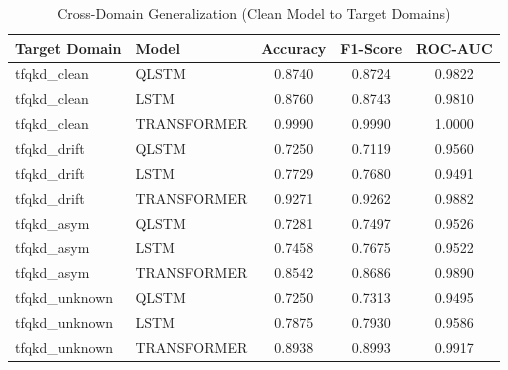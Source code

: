 \begin{table}[htbp]
\centering
\caption{Cross-Domain Generalization (Clean Model to Target Domains)}
\label{tab:cross_domain}
\begin{tabular}{@{}llccc@{}}
\toprule
\textbf{Target Domain} & \textbf{Model} & \textbf{Accuracy} & \textbf{F1-Score} & \textbf{ROC-AUC} \\ \midrule
tfqkd\_clean & QLSTM & 0.8740 & 0.8724 & 0.9822 \\
tfqkd\_clean & LSTM & 0.8760 & 0.8743 & 0.9810 \\
tfqkd\_clean & TRANSFORMER & 0.9990 & 0.9990 & 1.0000 \\
tfqkd\_drift & QLSTM & 0.7250 & 0.7119 & 0.9560 \\
tfqkd\_drift & LSTM & 0.7729 & 0.7680 & 0.9491 \\
tfqkd\_drift & TRANSFORMER & 0.9271 & 0.9262 & 0.9882 \\
tfqkd\_asym & QLSTM & 0.7281 & 0.7497 & 0.9526 \\
tfqkd\_asym & LSTM & 0.7458 & 0.7675 & 0.9522 \\
tfqkd\_asym & TRANSFORMER & 0.8542 & 0.8686 & 0.9890 \\
tfqkd\_unknown & QLSTM & 0.7250 & 0.7313 & 0.9495 \\
tfqkd\_unknown & LSTM & 0.7875 & 0.7930 & 0.9586 \\
tfqkd\_unknown & TRANSFORMER & 0.8938 & 0.8993 & 0.9917 \\
\bottomrule
\end{tabular}
\end{table}
